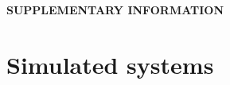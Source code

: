 \documentclass[aps,prl,superscriptaddress,twocolumn]{revtex4}
\begin{document}
%

\begin{acknowledgments}
\end{acknowledgments}
\pagebreak
\appendix
\begin{center}
{\bf SUPPLEMENTARY INFORMATION}
\end{center}

\section{Simulated systems}
\end{document}
